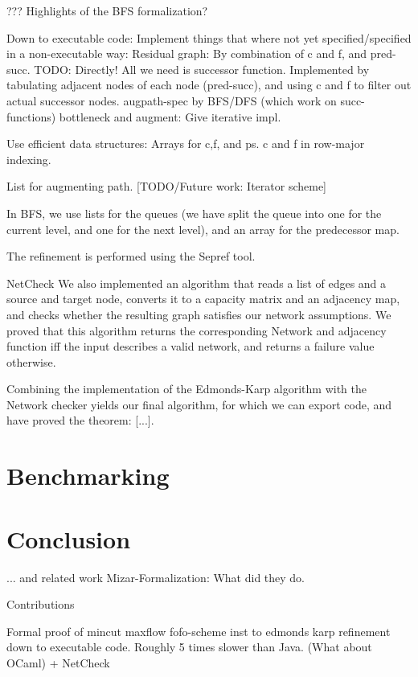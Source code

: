 \documentclass{llncs}
\begin{document}
        ??? Highlights of the BFS formalization?
    
  Down to executable code:
    Implement things that where not yet specified/specified in a non-executable way:
      Residual graph: By combination of c and f, and pred-succ. TODO: Directly!
        All we need is successor function. Implemented by tabulating 
          adjacent nodes of each node (pred-succ), and using c and f to filter out actual successor nodes. 
      augpath-spec by BFS/DFS (which work on succ-functions)
      bottleneck and augment: Give iterative impl.
      
    Use efficient data structures:
      Arrays for c,f, and ps. c and f in row-major indexing.
      
      List for augmenting path. [TODO/Future work: Iterator scheme]
  
      In BFS, we use lists for the queues (we have split the queue into one for 
        the current level, and one for the next level), and an array for the predecessor map. 
  
      The refinement is performed using the Sepref tool.

  NetCheck
    We also implemented an algorithm that reads a list of edges and a source and target node, 
    converts it to a capacity matrix and an adjacency map, and checks whether the resulting graph satisfies our network assumptions.
    We proved that this algorithm returns the corresponding Network and adjacency function iff the input describes a valid network,
    and returns a failure value otherwise.
    
  Combining the implementation of the Edmonds-Karp algorithm with the Network checker yields our final algorithm,
  for which we can export code, and have proved the theorem: [...]. 
    
    

\section{Benchmarking}
\section{Conclusion} 
  ... and related work
    Mizar-Formalization: What did they do.
    


  
Contributions

  Formal proof of mincut maxflow
  fofo-scheme
  inst to edmonds karp
  refinement down to executable code. Roughly 5 times slower than Java. (What about OCaml)
    + NetCheck
    
\end{document}
